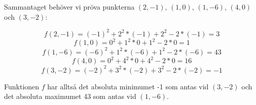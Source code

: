 \documentclass{article}
\begin{document}
Sammantaget behöver vi pröva punkterna $(2, -1)$, $(1, 0)$, $(1, -6)$, $(4, 0)$ och $(3, -2)$:

$$
f(2, -1)=(-1)^2+2^2*(-1)+2^2-2*(-1)=3
$$
$$
f(1, 0)=0^2+1^2*0+1^2-2*0=1
$$
$$
f(1, -6)=(-6)^2+1^2*(-6)+1^2-2*(-6)=43
$$
$$
f(4, 0)=0^2+4^2*0+4^2-2*0=16
$$
$$
f(3, -2)=(-2)^2+3^2*(-2)+3^2-2*(-2)=-1
$$

\vskip 0.2cm

Funktionen $f$ har alltså det absoluta minimumet -1 som antas vid $(3, -2)$ och det absoluta maximumet 43 som antas vid $(1, -6)$.
\end{document}
